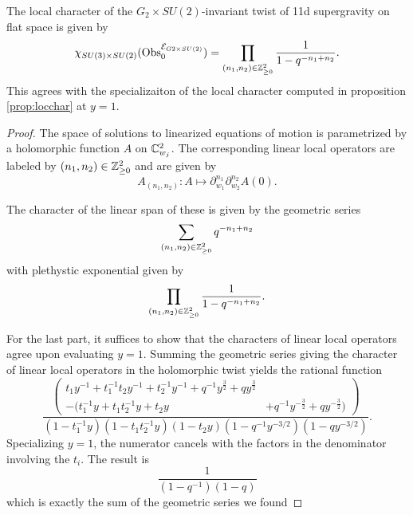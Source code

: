 \begin{prop}
The  local character of the $G_2\times SU(2)$-invariant twist of 11d supergravity on flat space is given by
\[
\chi_{SU(3)\times SU(2)}({\rm Obs}_0^{\mathcal E_{G2\times SU(2)}}) = \prod _{(n_1,n_2)\in \mathbb{Z}^2_{\geq 0}} \frac{1}{1-q^{-n_1+n_2}}.
\] 
This agrees with the specializaiton of the local character computed in proposition \ref{prop:locchar} at $y=1$.
\end{prop}
\begin{proof}
The space of solutions to linearized equations of motion is parametrized by a holomorphic function $A$ on $\mathbb{C}^2_{w_j}$. The corresponding linear local operators are labeled by $(n_1,n_2)\in \mathbb{Z}^2_{\geq 0}$  and are given by 
\[
A_{(n_1,n_2)} : A \mapsto \partial_{w_1}^{n_1}\partial_{w_2}^{n_2} A (0).
\]

The character of the linear span of these is given by the geometric series
\[
\sum _{(n_1,n_2)\in \mathbb{Z}^2_{\geq 0}} q^{-n_1+n_2}
\] 
with plethystic exponential given by 
\[
\prod _{(n_1,n_2)\in \mathbb{Z}^2_{\geq 0}} \frac{1}{1-q^{-n_1+n_2}}.
\]

For the last part, it suffices to show that the characters of linear local operators agree upon evaluating $y=1$. Summing the geometric series giving the character of linear local operators in the holomorphic twist yields the rational function \[\frac{\left (\begin{aligned}t_1y^{-1} + t_1^{-1}t_2y^{-1} + t_2^{-1}y^{-1} + q^{-1}y^{\frac 3 2} + qy^{\frac 3 2} \\  - (t_1^{-1}y + t_1t_2^{-1}y + t_2y &+ q^{-1}y^{-\frac 3 2} + qy^{-\frac 3 2})\end{aligned}\right)}{(1-t_1^{-1}y)(1-t_1t_2^{-1}y)(1-t_2y)(1-q^{-1}y^{-3/2})(1-qy^{-3/2})}.\] Specializing $y=1$, the numerator cancels with the factors in the denominator involving the $t_i$. The result is \[\frac{1}{(1-q^{-1})(1-q)}\] which is exactly the sum of the geometric series we found

\end{proof}


%

